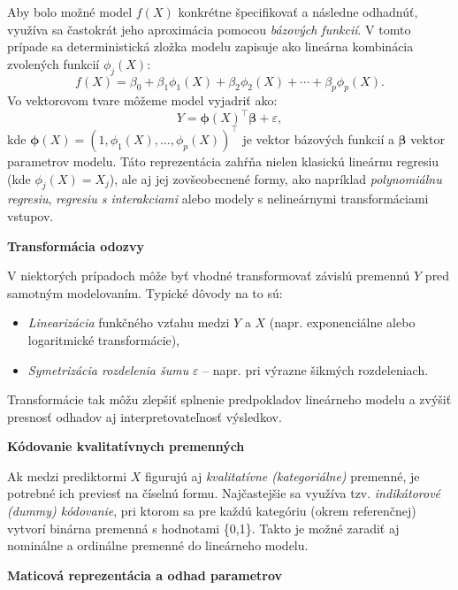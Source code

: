\noindent
Aby bolo možné model $f(X)$ konkrétne špecifikovať a následne odhadnúť, využíva sa častokrát jeho aproximácia pomocou \textit{bázových funkcií}. V tomto prípade sa deterministická zložka modelu zapisuje ako lineárna kombinácia zvolených funkcií $\phi_j(X)$:
\begin{equation}
f(X) = \beta_0 + \beta_1 \phi_1(X) + \beta_2 \phi_2(X) + \cdots + \beta_p \phi_p(X).
\end{equation}
Vo vektorovom tvare môžeme model vyjadriť ako:
\begin{equation}
Y = \boldsymbol{\phi}(X)^\top \boldsymbol{\beta} + \varepsilon,
\end{equation}
kde $\boldsymbol{\phi}(X) = (1, \phi_1(X), \ldots, \phi_p(X))^\top$ je vektor bázových funkcií a $\boldsymbol{\beta}$ vektor parametrov modelu. Táto reprezentácia zahŕňa nielen klasickú lineárnu regresiu (kde $\phi_j(X) = X_j$), ale aj jej zovšeobecnené formy, ako napríklad \textit{polynomiálnu regresiu}, \textit{regresiu s interakciami} alebo modely s nelineárnymi transformáciami vstupov.

\smallskip
\noindent
\textbf{Transformácia odozvy} 

V niektorých prípadoch môže byť vhodné transformovať závislú premennú $Y$ pred samotným modelovaním. Typické dôvody na to sú:

\begin{itemize}
  \item \textit{Linearizácia} funkčného vzťahu medzi $Y$ a $X$ (napr. exponenciálne alebo logaritmické transformácie),
  \item \textit{Symetrizácia rozdelenia šumu} $\varepsilon$ – napr. pri výrazne šikmých rozdeleniach.
\end{itemize}
Transformácie tak môžu zlepšiť splnenie predpokladov lineárneho modelu a zvýšiť presnosť odhadov aj interpretovateľnosť výsledkov.

\smallskip
\noindent
\textbf{Kódovanie kvalitatívnych premenných}

Ak medzi prediktormi $X$ figurujú aj \textit{kvalitatívne (kategoriálne)} premenné, je potrebné ich previesť na číselnú formu. Najčastejšie sa využíva tzv. \textit{indikátorové (dummy) kódovanie}, pri ktorom sa pre každú kategóriu (okrem referenčnej) vytvorí binárna premenná s hodnotami \{0,1\}. Takto je možné zaradiť aj nominálne a ordinálne premenné do lineárneho modelu.

\smallskip
\noindent
\textbf{Maticová reprezentácia a odhad parametrov}

